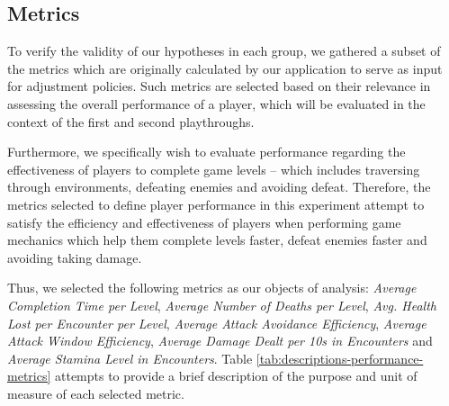 \subsection{Metrics}




To verify the validity of our hypotheses in each group, we gathered a subset of the metrics which are originally calculated by our application to serve as input for adjustment policies. Such metrics are selected based on their relevance in assessing the overall performance of a player, which will be evaluated in the context of the first and second playthroughs.

Furthermore, we specifically wish to evaluate performance regarding the effectiveness of players to complete game levels -- which includes traversing through environments, defeating enemies and avoiding defeat. Therefore, the metrics selected to define player performance in this experiment attempt to satisfy the efficiency and effectiveness of players when performing game mechanics which help them complete levels faster, defeat enemies faster and avoiding taking damage.

Thus, we selected the following metrics as our objects of analysis: \emph{Average Completion Time per Level}, \emph{Average Number of Deaths per Level}, \emph{Avg. Health Lost per Encounter per Level}, \emph{Average Attack Avoidance Efficiency}, \emph{Average Attack Window Efficiency}, \emph{Average Damage Dealt per 10s in Encounters} and \emph{Average Stamina Level in Encounters}. Table \ref{tab:descriptions-performance-metrics} attempts to provide a brief description of the purpose and unit of measure of each selected metric.

